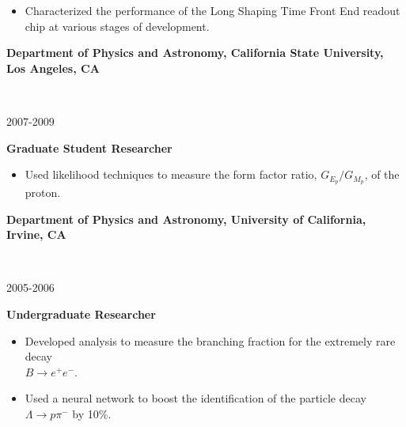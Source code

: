 \documentclass[11pt]{article}
\newcommand{\experienceentry}[5] { 
    \noindent
    \begin{minipage}[t]{0.84\textwidth} 
      \textbf{#1, #2}
    \end{minipage} \\[0.01pt]
    \begin{minipage}[t]{0.15\textwidth} \begin{flushright} #3 \end{flushright} \end{minipage} \hspace{0.01\textwidth}
    \begin{minipage}[t]{0.84\textwidth} 
      \textbf{\textcolor{indigodye}{#4}} \vspace{5pt} %
    \end{minipage} 
    #5 \vspace{11pt}
}
\begin{document}
                        {
            \begin{itemize}[label=\textcolor{indigodye}{$\circ$}, noitemsep, nolistsep, leftmargin=0.19\textwidth]
                \item Characterized the performance of the Long Shaping Time Front End readout chip at
                      various stages of development.
            \end{itemize}
                        } 
        \experienceentry{Department of Physics and Astronomy, California State University, Los Angeles}
                        {CA}
                        {2007-2009}
                        {Graduate Student Researcher}
                        {
            \begin{itemize}[label=\textcolor{indigodye}{$\circ$}, noitemsep, nolistsep, leftmargin=0.19\textwidth]
                \item Used likelihood techniques to measure the form factor ratio, $G_{E_p}/G_{M_p}$, of
                      the proton.
            \end{itemize}
                        }  
        \experienceentry{Department of Physics and Astronomy, University of California, Irvine}
                        {CA}
                        {2005-2006}
                        {Undergraduate Researcher}
                        { 
            \begin{itemize}[label=\textcolor{indigodye}{$\circ$}, noitemsep, nolistsep, leftmargin=0.19\textwidth]
                \item Developed analysis to measure the branching fraction for the extremely rare decay \\ 
                      $B\rightarrow e^+e^-$.
                \item Used a neural network to boost the identification of the particle decay 
                      $\Lambda \rightarrow p \pi^-$ by 10\%.
            \end{itemize}
                       } 
    
\end{document}

